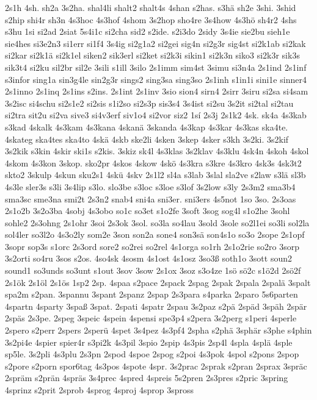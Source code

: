 {2s1h
4sh.
sh2a
3s2ha.
shal4li
shalt2
shalt4s
4shan
s2has.
s3hä
sh2e
3shi.
3shid
s2hip
shi4r
sh3n
4s3hoc
4s3hof
4shom
3s2hop
sho4re
3s4how
4s3hö
sh4r2
4shs
s3hu
1si
si2ad
2siat
5s4i1c
si2cha
sid2
s2ide.
s2i3do
2sidy
3s4ie
sie2bu
sieh1e
sie4hes
si3e2n3
si1err
si1f4
3s4ig
si2g1a2
si2gei
sig4n
si2g3r
sig4st
si2k1ab
si2kak
si2kar
si2k1ä
si2k1el
siken2
sik3erl
si2ket
si2k3i
sikin1
si2k3n
siko3
si2k3r
sik3s
sik3t4
si2ku
sil2br
sil2e
3sili
s1ill
3silo
2s1imm
sim4st
3simu
si3n4a
2s1ind
2s1inf
s3infor
sing1a
sin3g4le
sin2g3r
sings2
sing3sa
sing3so
2s1inh
s1in1i
sini1e
sinner4
2s1inno
2s1inq
2s1ins
s2ins.
2s1int
2s1inv
3sio
sion4
sirn4
2sirr
3siru
si2sa
si4sam
3s2isc
si4schu
si2s1e2
si2sis
s1i2so
si2s3p
sis3s4
3s4ist
si2su
3s2it
si2tal
si2tau
si2tra
sit2u
si2va
sive3
si4v3erf
siv1o4
si2vor
siz2
1sí
2s3j
2s1k2
4sk.
sk4a
4s3kab
s3kad
4skalk
4s3kam
4s3kana
4skanä
3skanda
4s3kap
4s3kar
4s3kas
ska4te.
4skateg
ska4tes
ska4to
4skä
4skb
ske2li
4sken
3skep
4sker
s3kh
3s2ki.
3s2kif
3s2kik
s3kin
4skir
ski1s
s2kis.
3skiz
sk4l
4s3klas
3s2klav
4s3klu
4sk4n
4skoh
4skol
4skom
4s3kon
3skop.
sko2pr
4skos
4skow
4skö
4s3kra
s3kre
4s3kro
4sk3s
4sk3t2
skto2
3skulp
4skun
sku2s1
4skü
4skv
2s1l2
sl4a
s3lab
3slal
sla2ve
s2law
s3lä
sl3b
4s3le
sler3s
s3li
3s4lip
s3lo.
slo3be
s3loc
s3loe
s3lof
3s2low
s3ly
2s3m2
sma3b4
sma3sc
sme3na
smi2t
2s3n2
snab4
sni4a
sni3er.
sni3ers
4s5not
1so
3so.
2s3oas
2s1o2b
3s2o3ba
4sobj
4s3obo
so1c
so3et
s1o2fe
3soft
3sog
sog4l
s1o2he
3sohl
sohle2
2s3ohng
2s1ohr
3soi
2s3ok
3sol.
so3la
so4lau
3sold
3sole
so2l1ei
so3li
sol2la
sol4ler
so3l2o
4s3o2ly
som2e
3son
son2a
sone4
son3sä
son4s1o
so3o
2sope
2s1opf
3sopr
sop3s
s1orc
2s3ord
sore2
so2rei
so2rel
4s1orga
so1rh
2s1o2rie
so2ro
3sorp
3s2orti
so4ru
3sos
s2os.
4so4sk
4sosm
4s1ost
4s1osz
3so3ß
soth1o
3sott
soun2
sound1
so3unds
so3unt
s1out
3sov
3sow
2s1ox
3soz
s3o4ze
1sö
sö2c
s1ö2d
2sö2f
2s1ök
2s1öl
2s1ös
1sp2
2sp.
4spaa
s2pace
2spack
2spag
2spak
2spala
2spalä
3spalt
spa2m
s2pan.
3spannu
3spant
2spanz
2spap
2s3para
s4parka
2sparo
5s6parten
4spartn
4sparty
3spaß
3spat.
2spati
4spatr
2spau
3s2paz
s2pä
2späd
3späh
2spär
2späs
2s3pe.
2speg
3speic
4spein
4spensi
spe3p4
s2pera
3s2perg
s1peri
4sperle
2spero
s2perr
2spers
2sperü
4spet
3s4pez
4s3pf4
2spha
s2phä
3sphär
s3phe
s4phin
3s2pi4e
4spier
spier4r
s3pi2k
4s3pil
3spio
2spip
4s3pis
2sp4l
4spla
4splä
4sple
sp5le.
3s2pli
4s3plu
2s3pn
2spod
4spoe
2spog
s2poi
4s3pok
4spol
s2pons
2spop
s2pore
s2porn
spor6tag
4s3pos
4spote
4spr.
3s2prac
2sprak
s2pran
2sprax
3spräc
2spräm
s2prän
4spräs
3s4prec
4spred
4spreis
5s2pren
2s3pres
s2pric
3spring
4sprinz
s2prit
2sprob
4sprog
4sproj
4sprop
3spross
}
